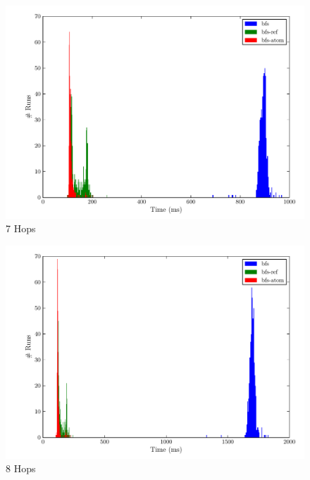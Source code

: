 \documentclass[12pt,letterpaper,oneside,notitlepage]{report}
\theoremstyle{definition}
\begin{document}
		\begin{figure}[!ht]
			\centering
			\includegraphics[scale=0.85]{7_hops}
			\caption{7 Hops}
			\label{fig:perf-7-hops}
		\end{figure}
		
		\begin{figure}[!ht]
			\centering
			\includegraphics[scale=0.85]{8_hops}
			\caption{8 Hops}
			\label{fig:perf-8-hops}
		\end{figure}
		
\end{document}
